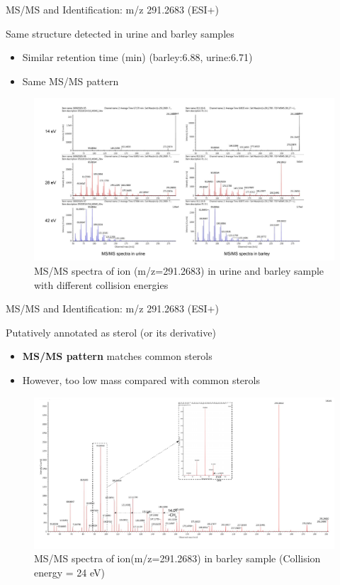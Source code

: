 \documentclass{beamer}
\begin{document}
\begin{frame}{MS/MS and Identification: m/z 291.2683 (ESI+)}
\begin{block} {Same structure detected in urine and barley samples}
\begin{itemize}
\item Similar retention time (min) (barley:6.88, urine:6.71)
\item Same MS/MS pattern
\end{itemize}
\begin{figure}[H]
    \centering
    \includegraphics[scale=0.25]{images/ION291.pdf}
    \caption{MS/MS spectra of ion (m/z=291.2683) in urine and barley sample with different collision energies}
    \label{fig:MSMSION291}
\end{figure}
\end{block}
\end{frame}
\begin{frame}{MS/MS and Identification: m/z 291.2683 (ESI+)}
\begin{block} {Putatively annotated as sterol (or its derivative)}
\begin{itemize}
\item \textbf{MS/MS pattern} matches common sterols
\item However, too low mass compared with common sterols
\end{itemize}
\begin{figure}[H]
    \centering
    \includegraphics[scale=0.35]{images/Annotation-291.pdf}
    \caption{MS/MS spectra of ion(m/z=291.2683) in barley sample (Collision energy = 24 eV)}
    \label{fig:291_barley1}
\end{figure}
\end{block}
\end{frame}
\end{document}
